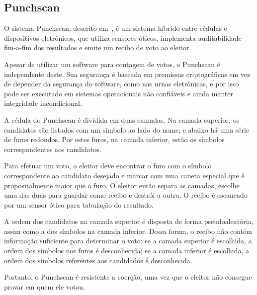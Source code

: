 \subsection{Punchscan}

O sistema Punchscan, descrito em~\cite{fisher2006punchscan}, é um sistema híbrido entre cédulas e dispositivos eletrônicos, que utiliza sensores óticos, implementa auditabilidade fim-a-fim dos resultados e emite um recibo de voto ao eleitor.

Apesar de utilizar um software para contagem de votos, o Punchscan é independente deste. Sua segurança é baseada em premissas criptográficas em vez de depender da segurança do software, como nas urnas eletrônicas, e por isso pode ser executado em sistemas operacionais não confiáveis e ainda manter integridade incondicional.

A cédula do Punchscan é dividida em duas camadas. Na camada superior, os candidatos são listados com um símbolo ao lado do nome, e abaixo há uma série de furos redondos. Por estes furos, na camada inferior, estão os símbolos correspondentes aos candidatos.

Para efetuar um voto, o eleitor deve encontrar o furo com o símbolo correspondente ao candidato desejado e marcar com uma caneta especial que é propositalmente maior que o furo. O eleitor então separa as camadas, escolhe uma das duas para guardar como recibo e destrói a outra. O recibo é escaneado por um sensor ótico para tabulação do resultado.

A ordem dos candidatos na camada superior é disposta de forma pseudoaleatória, assim como a dos símbolos na camada inferior. Dessa forma, o recibo não contém informação suficiente para determinar o voto: se a camada superior é escolhida, a ordem dos símbolos nos furos é desconhecida; se a camada inferior é escolhida, a ordem dos símbolos referentes aos candidados é desconhecida.

Portanto, o Punchscan é resistente a coerção, uma vez que o eleitor não consegue provar em quem ele votou.